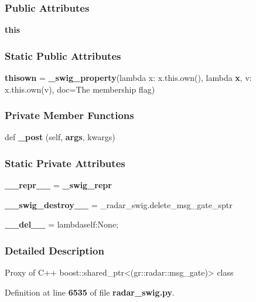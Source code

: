 \subsubsection*{Public Attributes}
\begin{DoxyCompactItemize}
\item 
{\bf this}
\end{DoxyCompactItemize}
\subsubsection*{Static Public Attributes}
\begin{DoxyCompactItemize}
\item 
{\bf thisown} = {\bf \+\_\+swig\+\_\+property}(lambda x\+: x.\+this.\+own(), lambda {\bf x}, v\+: x.\+this.\+own(v), doc=\textquotesingle{}The membership flag\textquotesingle{})
\end{DoxyCompactItemize}
\subsubsection*{Private Member Functions}
\begin{DoxyCompactItemize}
\item 
def {\bf \+\_\+post} (self, {\bf args}, kwargs)
\end{DoxyCompactItemize}
\subsubsection*{Static Private Attributes}
\begin{DoxyCompactItemize}
\item 
{\bf \+\_\+\+\_\+repr\+\_\+\+\_\+} = {\bf \+\_\+swig\+\_\+repr}
\item 
{\bf \+\_\+\+\_\+swig\+\_\+destroy\+\_\+\+\_\+} = \+\_\+radar\+\_\+swig.\+delete\+\_\+msg\+\_\+gate\+\_\+sptr
\item 
{\bf \+\_\+\+\_\+del\+\_\+\+\_\+} = lambdaself\+:\+None;
\end{DoxyCompactItemize}


\subsubsection{Detailed Description}
\begin{DoxyVerb}Proxy of C++ boost::shared_ptr<(gr::radar::msg_gate)> class\end{DoxyVerb}
 

Definition at line {\bf 6535} of file {\bf radar\+\_\+swig.\+py}.



